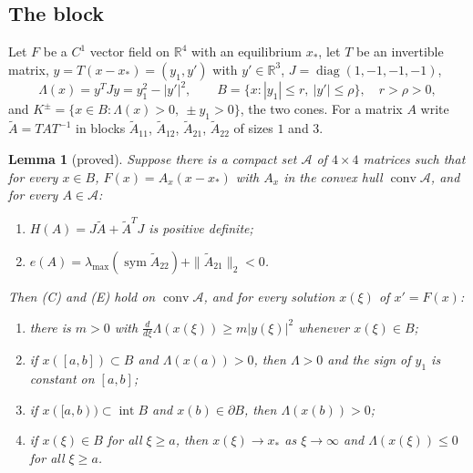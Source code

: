 \documentclass[11pt]{article}
\newtheorem{lemma}{Lemma}[section]
\theoremstyle{definition}
\newcommand{\R}{\mathbb{R}}
\newcommand{\sym}{\operatorname{sym}}
\newcommand{\xs}{x_*}
\begin{document}
\subsection{The block}\label{sec:block}

Let $F$ be a $C^1$ vector field on $\R^4$ with an equilibrium $\xs$, let $T$ be an invertible matrix, $y = T(x - \xs) = (y_1, y')$ with $y' \in \R^3$, $J = \operatorname{diag}(1, -1, -1, -1)$,
\[
  \Lambda(x) = y^T J y = y_1^2 - |y'|^2, \qquad B = \{x : |y_1| \le r,\ |y'| \le \rho\}, \quad r > \rho > 0,
\]
and $K^\pm = \{x \in B : \Lambda(x) > 0,\ \pm y_1 > 0\}$, the two cones. For a matrix $A$ write $\tilde A = TAT^{-1}$ in blocks $\tilde A_{11}$, $\tilde A_{12}$, $\tilde A_{21}$, $\tilde A_{22}$ of sizes $1$ and $3$.

\begin{lemma}[proved]\label{lem:block}
Suppose there is a compact set $\mathcal{A}$ of $4 \times 4$ matrices such that for every $x \in B$, $F(x) = A_x(x - \xs)$ with $A_x$ in the convex hull $\operatorname{conv}\mathcal{A}$, and for every $A \in \mathcal{A}$:
\begin{enumerate}
\item[(C)] $H(A) = J\tilde A + \tilde A^T J$ is positive definite;
\item[(E)] $e(A) = \lambda_{\max}(\sym\tilde A_{22}) + \|\tilde A_{21}\|_2 < 0$.
\end{enumerate}
Then (C) and (E) hold on $\operatorname{conv}\mathcal{A}$, and for every solution $x(\xi)$ of $x' = F(x)$:
\begin{enumerate}
\item[(a)] there is $m > 0$ with $\frac{d}{d\xi}\Lambda(x(\xi)) \ge m|y(\xi)|^2$ whenever $x(\xi) \in B$;
\item[(b)] if $x([a, b]) \subset B$ and $\Lambda(x(a)) > 0$, then $\Lambda > 0$ and the sign of $y_1$ is constant on $[a, b]$;
\item[(c)] if $x([a, b)) \subset \operatorname{int} B$ and $x(b) \in \partial B$, then $\Lambda(x(b)) > 0$;
\item[(d)] if $x(\xi) \in B$ for all $\xi \ge a$, then $x(\xi) \to \xs$ as $\xi \to \infty$ and $\Lambda(x(\xi)) \le 0$ for all $\xi \ge a$.
\end{enumerate}
\end{lemma}
\end{document}
